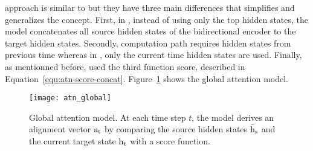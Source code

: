 \citet{1508.04025} approach is similar to \citet{1409.0473} but they have three main differences that simplifies and generalizes the concept. First, in \citet{1409.0473}, instead of using only the top hidden states, the model concatenates all source hidden states of the bidirectional encoder to the target hidden states.
Secondly, \citet{1409.0473} computation path requires hidden states from previous time whereas in \citet{1508.04025}, only the current time hidden states are used. Finally, as mentionned before, \citet{1409.0473} used the third function score, described in Equation~\ref{equ:atn-score-concat}.
Figure~\ref{fig:atn_global} shows the global attention model.

\begin{figure}
    \centering
    \texttt{[image: atn\_global]}
    \caption[Global attention model]{Global attention model. At each time step $t$, the model derives an alignment vector $\rm{a}_t$ by comparing the source hidden states $\rm{\bar{h}}_s$ and the current target state $\rm{h}_t$ with a score function.}
    \label{fig:atn_global}
\end{figure}

